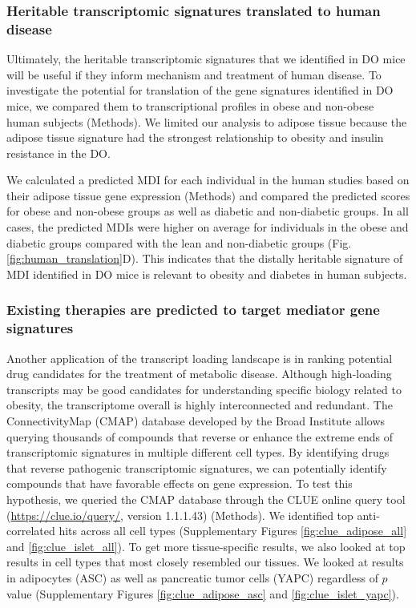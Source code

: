\documentclass[
]{article}
\begin{document}
\subsubsection{Heritable transcriptomic signatures translated to human
disease}\label{heritable-transcriptomic-signatures-translated-to-human-disease}

Ultimately, the heritable transcriptomic signatures that we identified
in DO mice will be useful if they inform mechanism and treatment of
human disease. To investigate the potential for translation of the gene
signatures identified in DO mice, we compared them to transcriptional
profiles in obese and non-obese human subjects (Methods). We limited our
analysis to adipose tissue because the adipose tissue signature had the
strongest relationship to obesity and insulin resistance in the DO.

We calculated a predicted MDI for each individual in the human studies
based on their adipose tissue gene expression (Methods) and compared the
predicted scores for obese and non-obese groups as well as diabetic and
non-diabetic groups. In all cases, the predicted MDIs were higher on
average for individuals in the obese and diabetic groups compared with
the lean and non-diabetic groups (Fig. \ref{fig:human_translation}D).
This indicates that the distally heritable signature of MDI identified
in DO mice is relevant to obesity and diabetes in human subjects.

\subsubsection{Existing therapies are predicted to target mediator gene
signatures}\label{existing-therapies-are-predicted-to-target-mediator-gene-signatures}

Another application of the transcript loading landscape is in ranking
potential drug candidates for the treatment of metabolic disease.
Although high-loading transcripts may be good candidates for
understanding specific biology related to obesity, the transcriptome
overall is highly interconnected and redundant. The ConnectivityMap
(CMAP) database \cite{pmid17008526, 
pmid29195078} developed by the Broad Institute allows querying thousands
of compounds that reverse or enhance the extreme ends of transcriptomic
signatures in multiple different cell types. By identifying drugs that
reverse pathogenic transcriptomic signatures, we can potentially
identify compounds that have favorable effects on gene expression. To
test this hypothesis, we queried the CMAP database through the CLUE
online query tool (\url{https://clue.io/query/}, version 1.1.1.43)
(Methods). We identified top anti-correlated hits across all cell types
(Supplementary Figures \ref{fig:clue_adipose_all} and
\ref{fig:clue_islet_all}). To get more tissue-specific results, we also
looked at top results in cell types that most closely resembled our
tissues. We looked at results in adipocytes (ASC) as well as pancreatic
tumor cells (YAPC) regardless of \(p\) value (Supplementary Figures
\ref{fig:clue_adipose_asc} and \ref{fig:clue_islet_yapc}).
\end{document}
